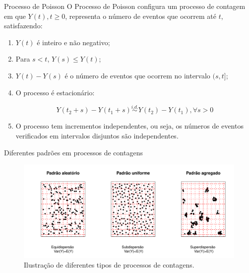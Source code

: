 \documentclass[10pt, aspectratio=169]{beamer}\usepackage[]{graphicx}\usepackage[]{color}
\begin{document}
\begin{frame}{Processo de Poisson}
O Processo de Poisson configura um processo de contagem em que 
$Y(t),t\geqslant 0$, representa o número de eventos que ocorrem até $t$, 
satisfazendo:
\vspace{0,5cm}
\begin{enumerate}
  \item $Y(t)$ é inteiro e não negativo;
  \item Para $s<t$, $Y(s)\leq Y(t)$;
  \item $Y(t)-Y(s)$ é o número de eventos que ocorrem no intervalo $(s,t]$;
\item O processo é estacionário:

$$
  Y(t_{2}+s)-Y(t_{1}+s) \overset{i.d. }{\sim}Y(t_{2})-Y(t_{1}), \forall s>0
$$
  
\item O processo tem incrementos independentes, ou seja, os números de 
eventos verificados em intervalos disjuntos são independentes.
\end{enumerate}

\end{frame}

\begin{frame}{Diferentes padrões em processos de contagens}

\begin{figure}[h]
\includegraphics[scale=0.6]{images/processos14.pdf}
\caption{Ilustração de diferentes tipos de processos de contagens.}
\label{Fig2}
\centering

\end{figure}
\end{frame}
\end{document}
